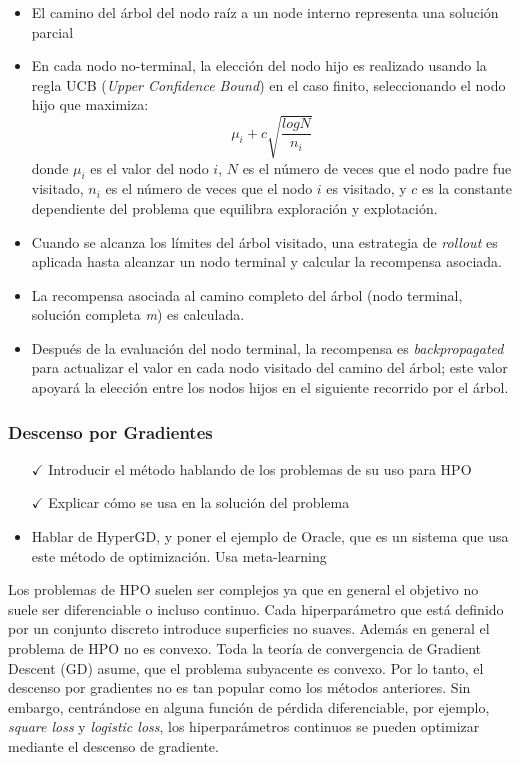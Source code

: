 \begin{itemize}
	\item El camino del árbol del nodo raíz a un node interno representa una solución parcial
	\item  En cada nodo no-terminal, la elección del nodo hijo es realizado usando la regla UCB (\textit{Upper Confidence Bound}) en el caso finito, seleccionando el nodo hijo que maximiza: 
	$$
	 \mu_i + c\sqrt{\frac{logN}{n_i}}
	$$
	donde $\mu_i$  es el valor del nodo $i$, $N$ es el número de veces que el nodo padre fue visitado, $n_i$ es el número de veces que el nodo $i$ es visitado, y $c$ es la constante dependiente del problema que equilibra exploración y explotación.
	\item Cuando se alcanza los límites del árbol visitado, una estrategia de \textit{rollout} es aplicada hasta alcanzar un nodo terminal y calcular la recompensa asociada.
	\item La recompensa asociada al camino completo del árbol (nodo terminal, solución completa \textit{m}) es calculada.
	\item Después de la evaluación del nodo terminal, la recompensa es \textit{backpropagated} para actualizar el valor en cada nodo visitado del camino del árbol; este valor apoyará la elección entre los nodos hijos en el siguiente recorrido por el árbol.
\end{itemize}

\subsubsection{Descenso por Gradientes}

\begin{itemize}
	\item[$\checkmark$] Introducir el método hablando de los problemas de su uso para HPO
	\item[$\checkmark$] Explicar cómo se usa en la solución del problema
	\item Hablar de HyperGD, y poner el ejemplo de Oracle, que es un sistema que usa este método de optimización. Usa meta-learning
\end{itemize}

Los problemas de HPO suelen ser complejos ya que en general el objetivo no suele ser diferenciable o incluso continuo. Cada hiperparámetro que está definido por un conjunto discreto introduce superficies no suaves. Además en general el problema de HPO no es convexo. Toda la teoría de convergencia de Gradient Descent  (GD) asume, que el problema subyacente es convexo. Por lo tanto, el descenso por gradientes no es tan popular como los métodos anteriores. Sin embargo, centrándose en alguna función de pérdida diferenciable, por ejemplo, \textit{square loss} y \textit{logistic loss}, los hiperparámetros continuos se pueden optimizar mediante el descenso de gradiente.

